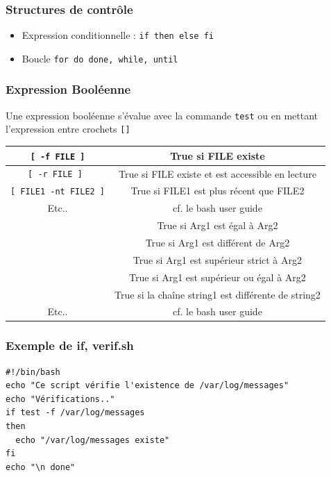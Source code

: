 \documentclass{beamer}
\begin{document}
\begin{frame}[fragile]
\frametitle{Structures de contrôle}
\begin{itemize}
\item Expression conditionnelle : \verb|if then else fi|
\item Boucle \verb|for do done, while, until|
\end{itemize}
\end{frame}

\begin{frame}[fragile]
\frametitle{Expression Booléenne}
Une expression booléenne s'évalue avec la commande \verb|test| ou en mettant l'expression entre crochets \verb|[]|
\begin{scriptsize}
\begin{center}
\begin{tabular}{|c|c|}
\hline
\verb|[ -f FILE ]| & True si FILE existe \\
\hline
\verb|[ -r FILE ] | & True si FILE existe et est accessible en lecture \\
\hline
\verb|[ FILE1 -nt FILE2 ]| & True si FILE1 est plus récent que FILE2 \\
\hline
Etc.. & cf. le bash user guide\\
\hline
[ Arg1 -eq Arg2 ] & True si Arg1 est égal à Arg2 \\
\hline
[ Arg1 -ne Arg2 ] & True si Arg1 est différent de Arg2 \\
\hline
\hline
[ Arg1 -gt Arg2 ] & True si Arg1 est supérieur strict à Arg2 \\
\hline
[ Arg1 -ge Arg2 ] & True si Arg1 est supérieur ou égal à Arg2 \\
\hline
[ string1 != string2 ] & True si la chaîne string1 est différente de string2 \\
\hline
Etc.. & cf. le bash user guide\\
\hline
\end{tabular}
\end{center}
\end{scriptsize}

\end{frame}


\begin{frame}[fragile]
  \frametitle{Exemple de if, verif.sh}
  \begin{block}{}
\begin{verbatim}
#!/bin/bash
echo "Ce script vérifie l'existence de /var/log/messages"
echo "Vérifications.."
if test -f /var/log/messages
then
  echo "/var/log/messages existe"
fi
echo "\n done"
\end{verbatim}
\end{block}
\end{frame}
\end{document}
